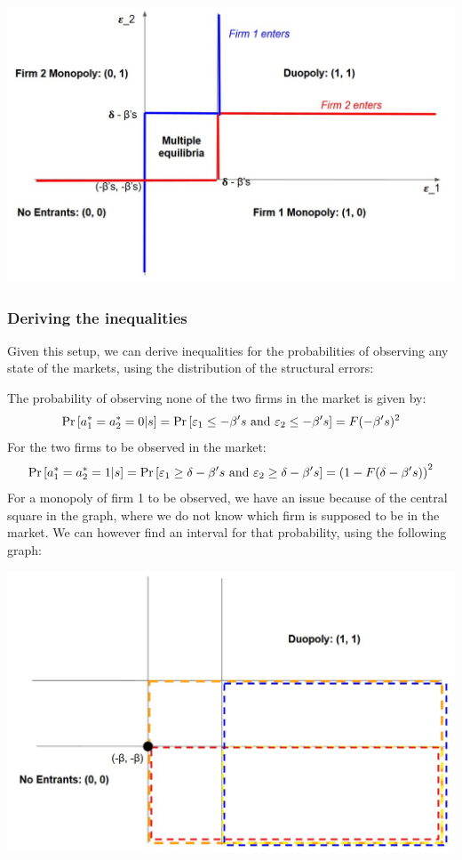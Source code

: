 \begin{center}
\includegraphics[scale=0.4]{figures/entry-br90-multeq.jpg}
\end{center}

\subsubsection{Deriving the inequalities}

Given this setup, we can derive inequalities for the probabilities of observing any state of the markets, using the distribution of the structural errors:

The probability of observing none of the two firms in the market is given by: $$ \operatorname{Pr}\left[a_1^* = a_2^* = 0 | s\right] = \operatorname{Pr}\left[\varepsilon_1 \leq -\beta's \text{ and } \varepsilon_2 \leq -\beta's\right] =  F(-\beta's)^2 $$
For the two firms to be observed in the market: $$ \operatorname{Pr}\left[a_1^* = a_2^* = 1 | s\right] = \operatorname{Pr}\left[\varepsilon_1 \geq \delta -\beta's \text{ and } \varepsilon_2 \geq \delta -\beta's\right] =  \left( 1 - F(\delta -\beta's) \right)^2 $$
For a monopoly of firm 1 to be observed, we have an issue because of the central square in the graph, where we do not know which firm is supposed to be in the market. We can however find an interval for that probability, using the following graph:

\begin{center}
\includegraphics[scale=0.4]{figures/entry-br90-ineq.jpg}
\end{center}

